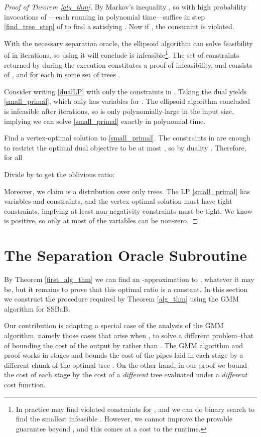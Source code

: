 \documentclass[11pt]{article}
\begin{document}
\begin{proof}[Proof of Theorem \ref{alg_thm}]
By Markov's inequality , so with high probability  invocations of ---each running in polynomial time---suffice in step \ref{find_tree_step} of  to find a  satisfying .  Now if , the constraint  is violated.

With the necessary separation oracle, the ellipsoid algorithm can solve feasibility of  in  iterations, so using  it will conclude  is infeasible\footnote{In practice  may find violated constraints for , and we can do binary search to find the smallest infeasible .  However, we cannot improve the provable guarantee beyond , and this comes at a cost to the runtime.}.  
The set of constraints  returned by  during the execution constitutes a proof of infeasibility,
and  consists of , and  for each  in some set of trees .  

Consider writing \eqref{dualLP} with only the constraints in .  Taking the dual yields \eqref{small_primal}, which only has variables  for .  The ellipsoid algorithm concluded  is infeasible after  iterations, so  is only polynomially-large in the input size, implying we can solve \eqref{small_primal} exactly in polynomial time.

Find a vertex-optimal solution  to \eqref{small_primal}.  The constraints in  are enough to restrict the optimal dual objective to be at most , so by duality .  Therefore, for all 

Divide by  to get the oblivious ratio:
 

Moreover, we claim  is a distribution over only  trees.  The LP \eqref{small_primal} has  variables and  constraints, and the vertex-optimal solution  must have  tight constraints, implying at least  non-negativity constraints must be tight.  We know  is positive, so only at most  of the variables  can be non-zero.
\end{proof}

\section{The Separation Oracle Subroutine }
\label{oracle_section}

By Theorem \ref{first_alg_thm} we can find an -approximation to , whatever it may be, but it remains to prove that this optimal ratio is a constant.  In this section we construct the procedure  required by Theorem \ref{alg_thm} using the GMM algorithm for SSBaB.

Our contribution is adapting a special case of the analysis of the GMM algorithm, namely those cases that arise when , to solve a different problem--that of bounding the cost of the output by  rather than .  The GMM algorithm and proof works in stages and bounds the cost of the pipes laid in each stage by a different chunk of the optimal tree .  On the other hand, in our proof we bound the cost of each stage by the cost of a \emph{different} tree evaluated under a \emph{different} cost function.
\end{document}
